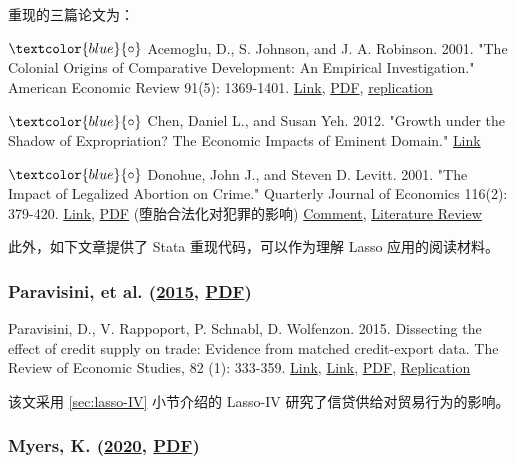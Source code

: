 {重现的三篇论文为：

\vspace{3pt}
$\textcolor{blue}{\circ}$ 
Acemoglu, D., S. Johnson, and J. A. Robinson. 2001. "The Colonial Origins of Comparative Development: An Empirical Investigation." American Economic Review 91(5): 1369-1401. \href{https://www.aeaweb.org/articles?id=10.1257/aer.91.5.1369}{Link},  \href{http://sci-hub.ren/10.1257/aer.91.5.1369}{PDF}, \href{http://economics.mit.edu/faculty/acemoglu/data/ajr2001}{replication}

$\textcolor{blue}{\circ}$ 
Chen, Daniel L., and Susan Yeh. 2012. "Growth under the Shadow of Expropriation? The Economic Impacts of Eminent Domain." \href{https://papers.ssrn.com/sol3/papers.cfm?abstract_id=2977074}{Link}

$\textcolor{blue}{\circ}$ 
Donohue, John J., and Steven D. Levitt. 2001. "The Impact of Legalized Abortion on Crime." Quarterly Journal of Economics 116(2): 379-420. \href{https://doi.org/10.1162/00335530151144050}{Link}, \href{http://sci-hub.ren/10.1162/00335530151144050}{PDF} (堕胎合法化对犯罪的影响)
\href{http://sci-hub.ren/10.1162/qjec.2008.123.1.407}{Comment}, \href{http://sci-hub.ren/10.1093/aler/ahaa008}{Literature Review}

\vspace{6pt}

此外，如下文章提供了 Stata 重现代码，可以作为理解 Lasso 应用的阅读材料。

\subsubsection{Paravisini, et al. (\href{https://doi.org/10.1093/restud/rdu028}{2015}, \href{http://sci-hub.ren/10.1093/restud/rdu028}{PDF})}

Paravisini, D., V. Rappoport, P. Schnabl, D. Wolfenzon. 2015. Dissecting the effect of credit supply on trade: Evidence from matched credit-export data. The Review of Economic Studies, 82 (1): 333-359. \href{https://doi.org/10.1093/restud/rdu028}{Link}, \href{https://doi.org/10.1093/restud/rdu028}{Link}, \href{http://sci-hub.ren/10.1093/restud/rdu028}{PDF}, \href{https://academic.oup.com/restud/article/82/1/333/1545669}{Replication}

该文采用 \ref{sec:lasso-IV} 小节介绍的 Lasso-IV 研究了信贷供给对贸易行为的影响。  

\subsubsection{Myers, K. (\href{https://doi.org/10.1257/app.20180518}{2020}, \href{http://sci-hub.ren/10.1257/app.20180518}{PDF})}

}
